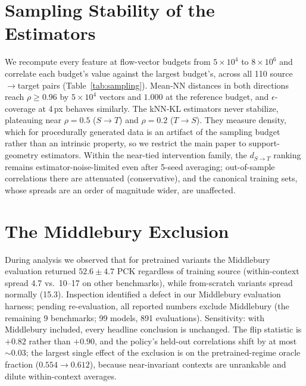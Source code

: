 \documentclass[runningheads]{llncs}
\newcommand{\dtb}{d_{S\to T}}
\newcommand{\dbt}{d_{T\to S}}
\newcommand{\pck}{PCK}
\begin{document}
\section{Sampling Stability of the Estimators}
\label{supp:sampling}

We recompute every feature at flow-vector budgets from $5{\times}10^4$ to
$8{\times}10^6$ and correlate each budget's value against the largest
budget's, across all 110 source$\to$target pairs (Table~\ref{tab:sampling}).
Mean-NN distances in both
directions reach $\rho \ge 0.96$ by $5{\times}10^4$ vectors and $1.000$ at
the reference budget, and $\epsilon$-coverage at 4\,px behaves similarly. The
kNN-KL estimators never stabilize, plateauing near $\rho{=}0.5$ ($S{\to}T$) and
$\rho{=}0.2$ ($T{\to}S$). They measure density, which
for procedurally generated data is an artifact of the sampling budget rather
than an intrinsic property, so we restrict the main paper to
support-geometry estimators. Within the near-tied intervention family, the
$\dtb$ ranking remains estimator-noise-limited even after 5-seed averaging;
out-of-sample correlations there are attenuated (conservative), and the
canonical training sets, whose spreads are an order of magnitude wider, are
unaffected.

\begin{table}[h]
\centering
\caption{\textbf{Sampling stability of the distance estimators.} Spearman $\rho$
between each estimator at flow-vector budget $N$ and its value at the largest
budget, over all 110 source$\to$target pairs. The support-geometry estimators
(mean-NN, $\epsilon$-coverage) converge to $\rho{\approx}1$ by $N{=}8$M, while the
density-based kNN-KL estimator drifts across budgets and never converges, most
severely in the coverage direction ($\dbt$).}
\label{tab:sampling}
\small
\setlength{\tabcolsep}{6pt}

\end{table}

\section{The Middlebury Exclusion}
\label{supp:mid}

During analysis we observed that for pretrained variants the Middlebury
evaluation returned $52.6 \pm 4.7$ \pck{} regardless of training source
(within-context spread 4.7 vs.\ 10--17 on other benchmarks), while
from-scratch variants spread normally (15.3). Inspection identified a defect
in our Middlebury evaluation harness; pending re-evaluation, all reported
numbers exclude Middlebury (the remaining 9 benchmarks; 99 models, 891
evaluations). Sensitivity: with Middlebury included, every headline conclusion
is unchanged. The flip statistic is $+0.82$ rather than $+0.90$, and the
policy's held-out correlations shift by at most ${\sim}0.03$; the largest
single effect of the exclusion is on the pretrained-regime oracle fraction
($0.554\!\to\!0.612$), because
near-invariant contexts are unrankable and dilute within-context averages.
\end{document}
